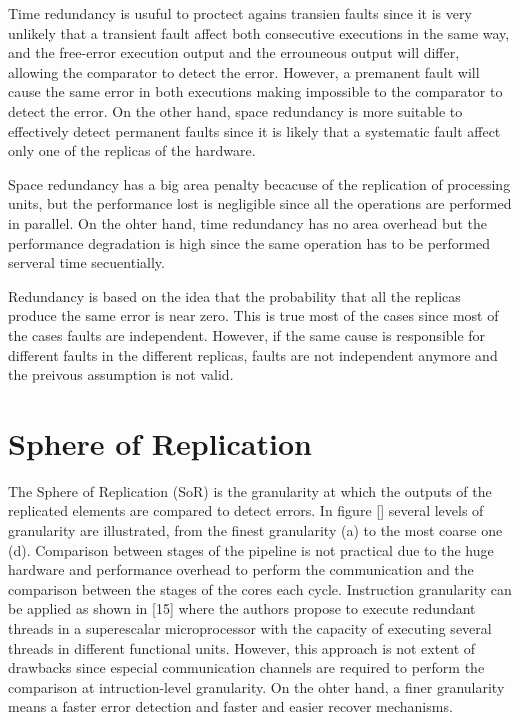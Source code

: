 Time redundancy is usuful to proctect agains transien faults since it is very unlikely that a transient fault affect both consecutive executions in the same way, and the free-error execution output and the errouneous output will differ, allowing the comparator to detect the error. However, a premanent fault will cause the same error in both executions making impossible to the comparator to detect the error. On the other hand, space redundancy is more suitable to effectively detect permanent faults since it is likely that a systematic fault affect only one of the replicas of the hardware. 

Space redundancy has a big area penalty becacuse of the replication of processing units, but the performance lost is negligible since all the operations are performed in parallel. On the ohter hand, time redundancy has no area overhead but the performance degradation is high since the same operation has to be performed serveral time secuentially.

Redundancy is based on the idea that the probability that all the replicas produce the same error is near zero. This is true most of the cases since most of the cases faults are independent. However, if the same cause is responsible for different faults in the different replicas, faults are not independent anymore and the preivous assumption is not valid.


\section{Sphere of Replication}

The Sphere of Replication (SoR) is the granularity at which the outputs of the replicated elements are compared to detect errors. In figure [] several levels of granularity are illustrated, from the finest granularity (a) to the most coarse one (d). Comparison between stages of the pipeline is not practical due to the huge hardware and performance overhead to perform the communication and the comparison between the stages of the cores each cycle. Instruction granularity can be applied as shown in [15] where the authors propose to execute redundant threads in a superescalar microprocessor with the capacity of executing several threads in different functional units. However, this approach is not extent of drawbacks since especial communication channels are required to perform the comparison at intruction-level granularity. On the ohter hand, a finer granularity means a faster error detection and faster and easier recover mechanisms. 

